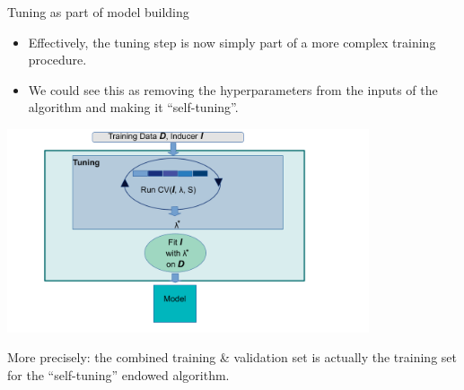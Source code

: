 \begin{vbframe}{Tuning as part of model building}
\begin{itemize}
\item Effectively, the tuning step is now simply part of a more complex training procedure.
\item We could see this as removing the hyperparameters from the inputs of the algorithm and making it \enquote{self-tuning}.
\end{itemize}
\begin{center}
\includegraphics[width=0.8\textwidth]{figure_man/autotune_in_model_fit.pdf}
\end{center}


\framebreak

More precisely: the combined training \& validation set is actually the training set for the \enquote{self-tuning} endowed algorithm. 


\end{vbframe}
